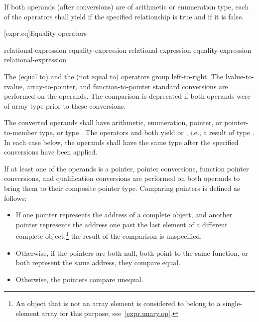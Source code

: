 \pnum
If both operands (after conversions) are of arithmetic or enumeration type, each
of the operators shall yield  if the specified relationship is true
and  if it is false.

[expr.eq]{Equality operators}%
%
%

\begin{bnf}
\br
    relational-expression\br
    equality-expression \terminal{==} relational-expression\br
    equality-expression \terminal{!=} relational-expression
\end{bnf}

\pnum
The \tcode{==} (equal to) and the \tcode{!=} (not equal to) operators
group left-to-right.
The
lvalue-to-rvalue,
array-to-pointer,
and function-to-pointer
standard conversions are performed on the operands.
The comparison is deprecated if
both operands were of array type
prior to these conversions.

\pnum
The converted operands shall have arithmetic, enumeration, pointer,
or pointer-to-member type, or type . The operators
\tcode{==} and \tcode{!=} both yield  or , i.e., a
result of type . In each case below, the operands shall have the
same type after the specified conversions have been applied.

\pnum
{}%
%
If at least one of the operands is a pointer,
pointer conversions,
function pointer conversions, and
qualification conversions
are performed on both operands to bring them to their composite pointer type.
Comparing pointers is defined as follows:

\begin{itemize}
\item
If one pointer represents the address of a complete object, and another
pointer represents the address one past the last element of a different
complete object,\footnote{An object that is not an array element is
considered to belong to a single-element array for this purpose;
see~\ref{expr.unary.op}.} the result of the comparison is unspecified.
\item
Otherwise, if the pointers are both null, both point to the same
%
function, or both represent the same address,
they compare equal.
\item
Otherwise, the pointers compare unequal.
\end{itemize}

